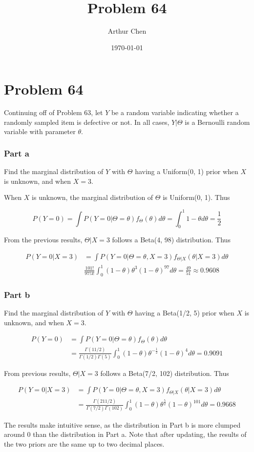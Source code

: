 \documentclass{article}
\author{Arthur Chen}
\title{Problem 64}
\date{\today}
\begin{document}
\section*{Problem 64}

Continuing off of Problem 63, let $Y$ be a random variable indicating whether a randomly sampled item is defective or not. In all cases, $Y|\Theta$ is a Bernoulli random variable with parameter $\theta$.

\subsubsection*{Part a}

Find the marginal distribution of $Y$ with $\Theta$ having a Uniform(0, 1) prior when $X$ is unknown, and when $X=3$.

When $X$ is unknown, the marginal distribution of $\Theta$ is Uniform(0, 1). Thus

\[
P(Y=0) = \int P(Y=0|\Theta=\theta)f_{\Theta}(\theta)d\theta = \int_0^1 1-\theta d\theta = \frac{1}{2}
\]

From the previous results, $\Theta|X=3$ follows a Beta(4, 98) distribution. Thus

\begin{align*}
P(Y=0|X=3) &= \int P(Y=0|\Theta = \theta, X=3) f_{\Theta|X}(\theta|X=3) d\theta \\
& \frac{101!}{97!3!} \int_0^1 (1-\theta) \theta^3(1-\theta)^{97} d\theta = \frac{49}{51} \approx 0.9608
\end{align*}

\subsubsection*{Part b}

Find the marginal distribution of $Y$ with $\Theta$ having a Beta(1/2, 5) prior when $X$ is unknown, and when $X=3$.

\begin{align*}
P(Y=0) &= \int P(Y=0|\Theta=\theta)f_{\Theta}(\theta)d\theta \\
& = \frac{\Gamma(11/2)}{\Gamma(1/2)\Gamma(5)} \int_0^1 (1-\theta)\theta^{-\frac{1}{2}} (1-\theta)^4  d\theta = 0.9091
\end{align*}

From previous results, $\Theta|X=3$ follows a Beta(7/2, 102) distribution. Thus

\begin{align*}
P(Y=0|X=3) &= \int P(Y=0|\Theta = \theta, X=3) f_{\Theta|X}(\theta|X=3) d\theta  \\
&= \frac{\Gamma(211/2)}{\Gamma(7/2)\Gamma(102)}\int_0^1 (1-\theta)\theta^\frac{5}{2}(1-\theta)^{101} d\theta = 0.9668
\end{align*}

The results make intuitive sense, as the distribution in Part b is more clumped around 0 than the distribution in Part a. Note that after updating, the results of the two priors are the same up to two decimal places.
\end{document}
